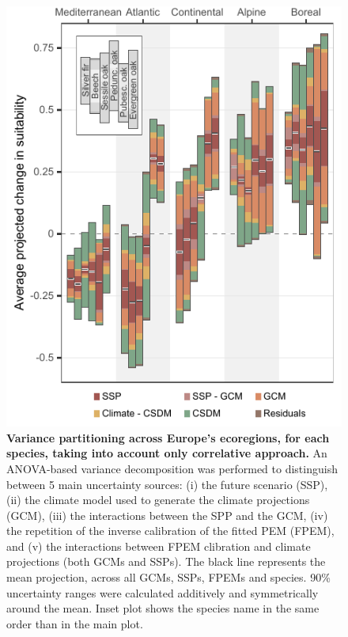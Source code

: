 \begin{figure}[htpb]
\centering
\vspace*{-0.3cm}
\includegraphics{chapter4/figs/anova_within_species_byecoregion_onlyhybrid-1.pdf}
\caption{\textbf{Variance partitioning across Europe's ecoregions, for each species, taking into account only correlative approach.} An ANOVA-based variance decomposition was performed to distinguish between 5 main uncertainty sources: (i) the future scenario (SSP), (ii) the climate model used to generate the climate projections (GCM), (iii) the interactions between the SPP and the GCM, (iv) the repetition of the inverse calibration of the fitted PEM (FPEM), and (v) the interactions between FPEM clibration and climate projections (both GCMs and SSPs). The black line represents the mean projection, across all GCMs, SSPs, FPEMs and species. 90\% uncertainty ranges were calculated additively and symmetrically around the mean. Inset plot shows the species name in the same order than in the main plot.}
\vspace*{-5.2cm}
\end{figure}

\clearpage

